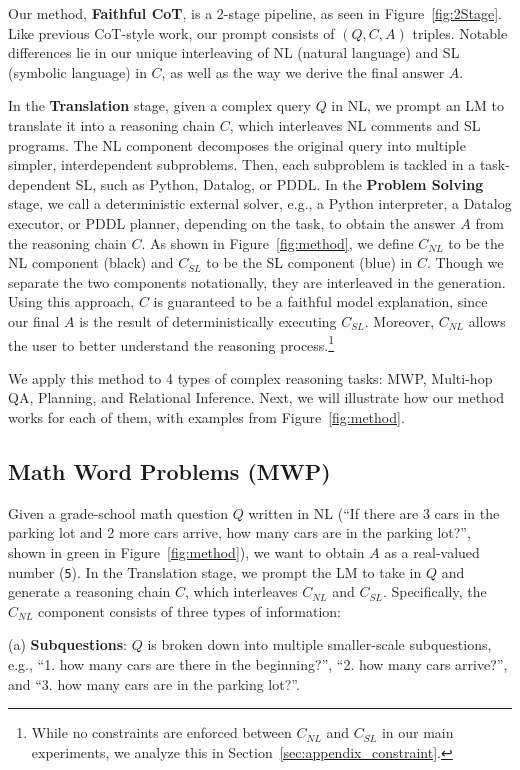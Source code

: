 \documentclass[11pt]{article}
\begin{document}
Our method, \textbf{Faithful CoT}, is a 2-stage pipeline, as seen in Figure~\ref{fig:2Stage}. Like previous CoT-style work, our prompt consists of $(Q, C, A)$ triples. Notable differences lie in our unique interleaving of NL (natural language) and SL (symbolic language) in $C$, as well as the way we derive the final answer $A$.

In the \textbf{Translation} stage, given a complex query $Q$ in NL, we prompt an LM to translate it into a reasoning chain $C$, which interleaves NL comments and SL programs. The NL component decomposes the original query into multiple simpler, interdependent subproblems. Then, each subproblem is tackled in a task-dependent SL, such as Python, Datalog, or PDDL. In the \textbf{Problem Solving} stage, we call a deterministic external solver, e.g., a Python interpreter, a Datalog executor, or PDDL planner, depending on the task, to obtain the answer $A$ from the reasoning chain $C$. As shown in Figure~\ref{fig:method}, we define $C_{NL}$ to be the NL component (black) and $C_{SL}$ to be the SL component (blue) in $C$. Though we separate the two components notationally, they are interleaved in the generation. Using this approach, $C$ is guaranteed to be a faithful model explanation, since our final $A$ is the result of deterministically executing $C_{SL}$. Moreover, $C_{NL}$ allows the user to better understand the reasoning process.\footnote{While no constraints are enforced between $C_{NL}$ and $C_{SL}$ in our main experiments, we analyze this in Section~\ref{sec:appendix_constraint}.}

We apply this method to 4 types of complex reasoning tasks: MWP, Multi-hop QA, Planning, and Relational Inference. Next, we will illustrate how our method works for each of them, with examples from Figure~\ref{fig:method}. 

\subsection{Math Word Problems (MWP)} Given a grade-school math question $Q$ written in NL (``If there are 3 cars in the parking lot and 2 more cars arrive, how many cars are in the parking lot?'', shown in green in Figure~\ref{fig:method}), we want to obtain $A$ as a real-valued number (\texttt{5}). In the Translation stage, we prompt the LM to take in $Q$ and generate a reasoning chain $C$, which interleaves $C_{NL}$ and $C_{SL}$. Specifically, the $C_{NL}$ component consists of three types of information: 

(a) \textbf{Subquestions}: $Q$ is broken down into multiple smaller-scale subquestions, e.g., ``1. how many cars are there in the beginning?'', ``2. how many cars arrive?'', and ``3. how many cars are in the parking lot?''.
\end{document}

